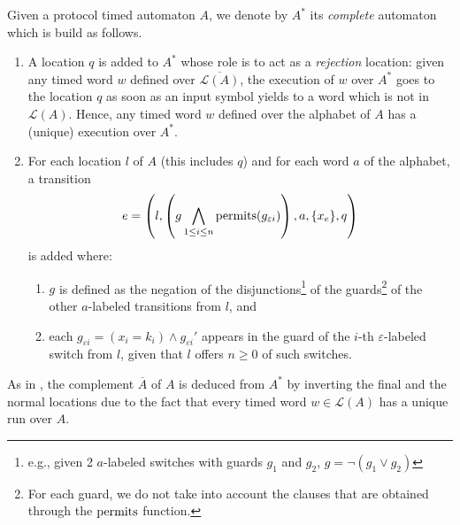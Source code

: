 \begin{procedure}
Given a protocol timed automaton $A$, we denote by $A^*$ its \emph{complete} automaton which is build as follows.
\begin{enumerate}

  \item A location $q$ is added to $A^*$ whose role is to act as a \emph{rejection} location: given any timed word $w$ defined over $\overline{\mathcal{L}(A)}$, the execution of $w$ over $A^*$ goes to the location $q$ as soon as an input symbol yields to a word which is not in $\mathcal{L}(A)$. Hence, any timed word $w$ defined over the alphabet of $A$ has a (unique) execution over $A^*$.

  \item For each location $l$ of $A$ (this includes $q$) and for each word $a$ of the alphabet, a transition
  $$ 
  e = \left( 
    l, \left( g \bigwedge\limits_{1 \leq i \leq n} \operatorname{permits}(g_{\varepsilon i}) \right), a, \{ x_e \}, q
    \right)
  $$ is added where:
  \begin{enumerate}
    \item $g$ is defined as the negation of the disjunctions\footnote{e.g., given 2 $a$-labeled switches with guards $g_1$ and $g_2$, $g = \neg(g_1 \vee g_2)$} of the guards\footnote{For each guard, we do not take into account the clauses that are obtained through the $\operatorname{permits}$ function.} of the other $a$-labeled transitions from $l$, and
    \item each $g_{\varepsilon i} = (x_i = k_i) \wedge g_{\varepsilon i}'$ appears in the guard of the $i$-th $\varepsilon$-labeled switch from $l$, given that $l$ offers $n \geq 0$ of such switches.
  \end{enumerate}

\end{enumerate}
As in \cite{RADLD94}, the complement $\overline{A}$ of $A$ is deduced from $A^*$ by inverting the final and the normal locations due to the fact that every timed word $w \in \mathcal{L}(A)$ has a unique run over $A$.
\end{procedure}

